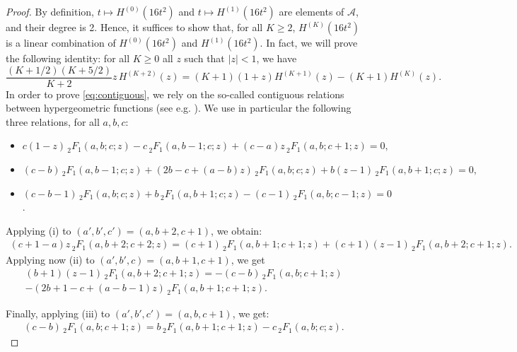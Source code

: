 \documentclass[12pt]{amsart}
\theoremstyle{plain}
\theoremstyle{remark}
\def\cA{\mathcal{A}}
\begin{document}
\begin{proof}
By definition, $t \mapsto H^{(0)}(16t^2)$ and $t \mapsto H^{(1)}(16t^2)$ are elements of $\cA$, and their degree is 2. Hence, it suffices to show that, for all $K \geq 2$, $H^{(K)}(16t^2)$ is a linear combination of $H^{(0)}(16t^2)$ and $H^{(1)}(16t^2)$. In fact, we will prove the following identity: for all $K \geq 0$ all $z$ such that $|z|<1$, we have
\begin{equation}
\label{eq:contiguous}
\frac{(K+1/2)(K+5/2)}{K+2} z \, H^{(K+2)}(z) = (K+1)(1+z)H^{(K+1)}(z)-(K+1)H^{(K)}(z).
\end{equation}
In order to prove \eqref{eq:contiguous}, we rely on the so-called contiguous relations between hypergeometric functions (see e.g. \cite[Section $2.5$]{AAR99}). We use in particular the following three relations, for all $a,b,c$:
\begin{itemize}
\item[(i)] $c(1-z)\,{}_{2}^{}{{}{{}{F_{1}^{}}}}\left(a,b;c;z\right)-c\,{}_{2}^{}{{}{{}{F_{1}^{}}}}\left(a,b-1;c;z\right)+(c-a)z\,{}_{2}^{}{{}{{}{F_{1}^{}}}}\left(a,b;c+1;z%
\right)=0,$
\item[(ii)] $(c-b)\,{}_{2}^{}{{}{{}{F_{1}^{}}}}\left(a,b-1;c;z\right)+\left(2b-c+(a-b)z\right)\,{}_{2}^{}{{}{{}{F_{1}^{}}}}\left(a,b;c;z\right)+b(z%
-1)\,{}_{2}^{}{{}{{}{F_{1}^{}}}}\left(a,b+1;c;z\right)=0,$
\item[(iii)] $(c-b-1)\,{}_{2}^{}{{}{{}{F_{1}^{}}}}\left(a,b;c;z\right)+b\,{}_{2}^{}{{}{{}{F_{1}^{}}}}\left(a,b+1;c;z\right)-(c-1)\,{}_{2}^{}{{}{{}{F_{1}^{}}}}\left(a,b;c-1;z%
\right)=0$.
\end{itemize}

Applying (i) to $(a',b',c')=(a,b+2,c+1)$, we obtain:
\begin{align*}
(c+1-a)z \,{}_{2}^{}{{}{{}{F_{1}^{}}}}(a,b+2;c+2;z) =  (c+1) \,{}_{2}^{}{{}{{}{F_{1}^{}}}}(a,b+1;c+1;z) + (c+1)(z-1)\, {}_{2}^{}{{}{{}{F_{1}^{}}}}(a,b+2;c+1;z).
\end{align*}
Applying now (ii) to $(a',b',c) = (a,b+1,c+1)$, we get
\begin{multline*}
(b+1)(z-1)\,{}_{2}^{}{{}{{}{F_{1}^{}}}}(a,b+2;c+1;z) = -(c-b)\,{}_{2}^{}{{}{{}{F_{1}^{}}}}(a,b;c+1;z)\\
- (2b+1-c+(a-b-1)z)\,{}_{2}^{}{{}{{}{F_{1}^{}}}}(a,b+1;c+1;z).
\end{multline*}

Finally, applying (iii) to $(a',b',c')=(a,b,c+1)$, we get:
\begin{align*}
(c-b) \,{}_{2}^{}{{}{{}{F_{1}^{}}}}(a,b;c+1;z) = b\,{}_{2}^{}{{}{{}{F_{1}^{}}}}(a,b+1;c+1;z)-c\,{}_{2}^{}{{}{{}{F_{1}^{}}}}(a,b;c;z).
\end{align*}


\end{proof}
\end{document}
